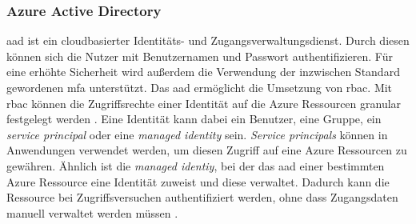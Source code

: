 \subsubsection{Azure Active Directory} \label{subsec:grundlagen:azure:sicherheitUndDatenschutz:aad}
\ac{aad} ist ein cloudbasierter Identitäts- und Zugangsverwaltungsdienst. Durch diesen können sich die Nutzer mit Benutzernamen und Passwort authentifizieren. Für eine erhöhte Sicherheit wird außerdem die Verwendung der inzwischen Standard gewordenen \ac{mfa} unterstützt. Das \ac{aad} ermöglicht die Umsetzung von \ac{rbac}. Mit \ac{rbac} können die Zugriffsrechte einer Identität auf die Azure Ressourcen granular festgelegt werden \cite{stefanovic_azure_2021}. Eine Identität kann dabei ein Benutzer, eine Gruppe, ein \textit{service principal} oder eine \textit{managed identity} sein. \textit{Service principals} können in Anwendungen verwendet werden, um diesen Zugriff auf eine Azure Ressourcen zu gewähren. Ähnlich ist die \textit{managed identiy}, bei der das \ac{aad} einer bestimmten Azure Ressource eine Identität zuweist und diese verwaltet. Dadurch kann die Ressource bei Zugriffsversuchen authentifiziert werden, ohne dass Zugangsdaten manuell verwaltet werden müssen \cite{copeland_security_2021}.


